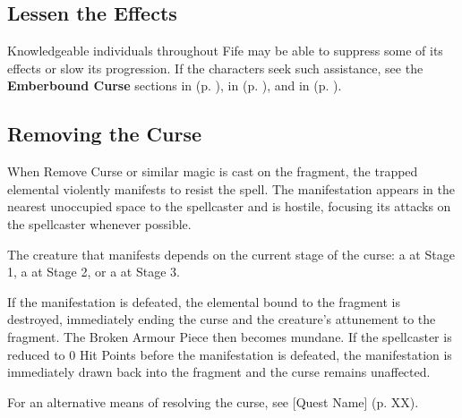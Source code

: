 \subsection*{Lessen the Effects}
{\entryfont Knowledgeable individuals throughout Fife may be able to suppress some of its effects or slow its progression. If the characters seek such assistance, see the \textbf{Emberbound Curse} sections in \hyperref[subsec:AuchtertoolEmberboundCurse]{} (p. \pageref{subsec:AuchtertoolEmberboundCurse}), in \hyperref[subsec:MethvenEmberboundCurse]{} (p. \pageref{subsec:MethvenEmberboundCurse}), and in \hyperref[subsec:WoodsOfLomondEmberboundCurse]{} (p. \pageref{subsec:WoodsOfLomondEmberboundCurse}).}

\subsection*{Removing the Curse}
{\entryfont When Remove Curse or similar magic is cast on the fragment, the trapped elemental violently manifests to resist the spell. The manifestation appears in the nearest unoccupied space to the spellcaster and is hostile, focusing its attacks on the spellcaster whenever possible.

The creature that manifests depends on the current stage of the curse: a \hyperref[monster:Firegeist]{} at Stage 1, a \hyperref[monster:FireElemental]{} at Stage 2, or a \hyperref[monster:FireElementalMyrmidon]{} at Stage 3.

If the manifestation is defeated, the elemental bound to the fragment is destroyed, immediately ending the curse and the creature's attunement to the fragment. The Broken Armour Piece then becomes mundane. If the spellcaster is reduced to 0 Hit Points before the manifestation is defeated, the manifestation is immediately drawn back into the fragment and the curse remains unaffected.

For an alternative means of resolving the curse, see [Quest Name] (p. XX).}